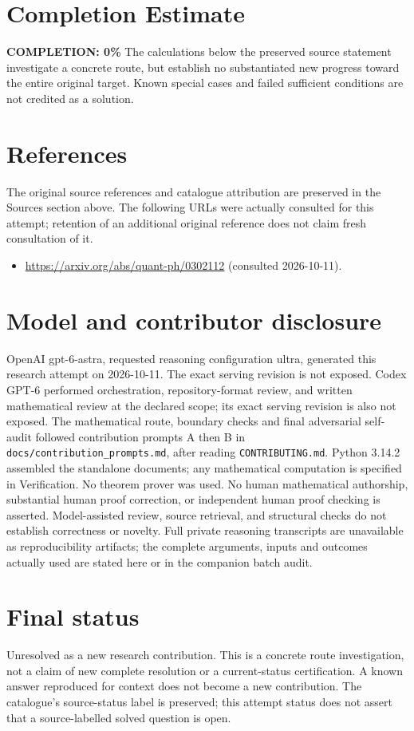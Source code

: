 \documentclass[11pt]{article}
\begin{document}
\section{Completion Estimate}
\noindent\textbf{COMPLETION: 0\%}
The calculations below the preserved source statement investigate a concrete route,
but establish no substantiated new progress toward the entire original target.
Known special cases and failed sufficient conditions are not credited as a solution.
\section{References}
The original source references and catalogue attribution are preserved in the
Sources section above. The following URLs were actually consulted for this attempt;
retention of an additional original reference does not claim fresh consultation of it.
\begin{itemize}
\item \url{https://arxiv.org/abs/quant-ph/0302112} (consulted 2026-10-11). 
\end{itemize}
\section{Model and contributor disclosure}
OpenAI gpt-6-astra, requested reasoning configuration ultra, generated this research
attempt on 2026-10-11. The exact serving revision is not exposed. Codex GPT-6
performed orchestration, repository-format review, and written mathematical review at the declared scope; its exact serving revision
is also not exposed. The mathematical route, boundary checks and final adversarial
self-audit followed contribution prompts A then B in
\texttt{docs/contribution\_prompts.md}, after reading \texttt{CONTRIBUTING.md}.
Python 3.14.2 assembled the standalone documents; any mathematical computation is
specified in Verification. No theorem prover was used. No human mathematical
authorship, substantial human proof correction, or independent human proof checking
is asserted. Model-assisted review, source retrieval, and structural checks do not
establish correctness or novelty. Full private reasoning transcripts are unavailable
as reproducibility artifacts; the complete arguments, inputs and outcomes actually
used are stated here or in the companion batch audit.
\section{Final status}
Unresolved as a new research contribution. This is a concrete route investigation,
not a claim of new complete resolution or a current-status certification. A known
answer reproduced for context does not become a new contribution. The catalogue's
source-status label is preserved; this attempt status does not assert that a
source-labelled solved question is open.
\end{document}
